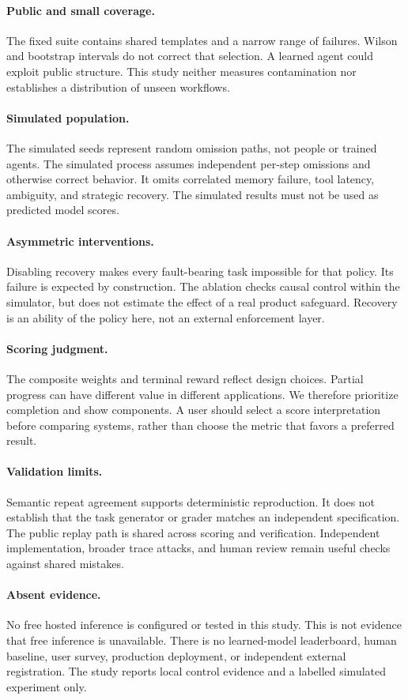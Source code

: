 \documentclass{article}
\begin{document}
\paragraph{Public and small coverage.} The fixed suite contains shared templates and a narrow range of failures. Wilson and bootstrap intervals do not correct that selection. A learned agent could exploit public structure. This study neither measures contamination nor establishes a distribution of unseen workflows.
\paragraph{Simulated population.} The simulated seeds represent random omission paths, not people or trained agents. The simulated process assumes independent per-step omissions and otherwise correct behavior. It omits correlated memory failure, tool latency, ambiguity, and strategic recovery. The simulated results must not be used as predicted model scores.
\paragraph{Asymmetric interventions.} Disabling recovery makes every fault-bearing task impossible for that policy. Its failure is expected by construction. The ablation checks causal control within the simulator, but does not estimate the effect of a real product safeguard. Recovery is an ability of the policy here, not an external enforcement layer.
\paragraph{Scoring judgment.} The composite weights and terminal reward reflect design choices. Partial progress can have different value in different applications. We therefore prioritize completion and show components. A user should select a score interpretation before comparing systems, rather than choose the metric that favors a preferred result.
\paragraph{Validation limits.} Semantic repeat agreement supports deterministic reproduction. It does not establish that the task generator or grader matches an independent specification. The public replay path is shared across scoring and verification. Independent implementation, broader trace attacks, and human review remain useful checks against shared mistakes.
\paragraph{Absent evidence.} No free hosted inference is configured or tested in this study. This is not evidence that free inference is unavailable. There is no learned-model leaderboard, human baseline, user survey, production deployment, or independent external registration. The study reports local control evidence and a labelled simulated experiment only.
\end{document}

